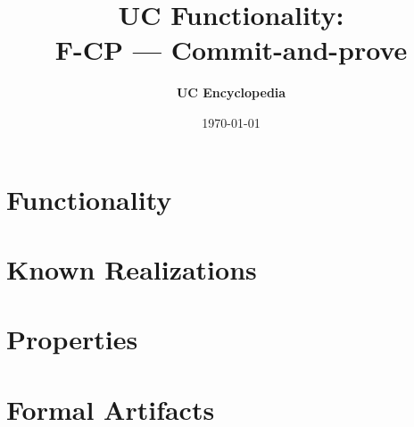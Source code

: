 \documentclass[11pt,a4paper]{article}
\title{\textbf{\Large UC Functionality:}\\[0.2em] \Large F-CP --- Commit-and-prove}
\author{\textbf{UC Encyclopedia}}
\date{\today}
\newtheorem{functionality}{Functionality}
\begin{document}
\maketitle

\begin{abstract}
\end{abstract}

\section{Functionality}

%

\section{Known Realizations}


\section{Properties}


\section{Formal Artifacts}

\end{document}
